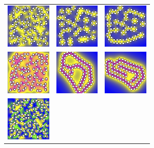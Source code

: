 \begin{figure}
  \vspace{-15pt}
  \begin{center}
    \begin{tabular}{m{0.9in}m{0.9in}m{0.9in}}                 
    \includegraphics[width=0.85in]{figures/SpecificAim1/N100B1.jpg}
    &\includegraphics[width=0.85in]{figures/SpecificAim1/N100B2.jpg}
     &\includegraphics[width=0.85in]{figures/SpecificAim1/N100B3.jpg}    \\
    \includegraphics[width=0.85in]{figures/SpecificAim1/N100C1.jpg}
    &\includegraphics[width=0.85in]{figures/SpecificAim1/N100C2.jpg}
      &\includegraphics[width=0.85in]{figures/SpecificAim1/N100C3.jpg}    \\
      \includegraphics[width=0.85in]{figures/SpecificAim1/N100A1.jpg}

\end{tabular}
\end{center}
\end{figure}
